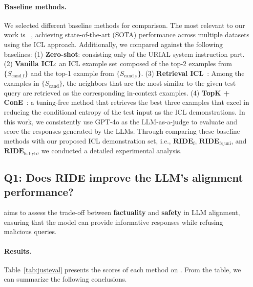 \paragraph{Baseline methods.}
We selected different baseline methods for comparison. 
The most relevant to our work is \textbf{\methodname{}}~\citep{DBLP:conf/iclr/LinRLDSCB024}, achieving state-of-the-art (SOTA) performance across multiple datasets using the ICL approach. 
Additionally, we compared against the following baselines: (1) \textbf{Zero-shot}: consisting only of the URIAL system instruction part. (2) \textbf{Vanilla ICL}: an ICL example set composed of the top-2 examples from $\{S_\text{cand\_f}\}$ and the top-1 example from $\{S_\text{cand\_s}\}$. (3) \textbf{Retrieval ICL}~\citep{liu2022makes}: Among the examples in $\{S_\text{cand}\}$, the neighbors that are the most similar to the given test query are retrieved as the corresponding in-context examples. (4) \textbf{TopK + ConE}~\citep{peng2024revisiting}: a tuning-free method that retrieves the best three examples that excel in reducing the conditional entropy of the test input as the ICL demonstrations.
In this work, we consistently use GPT-4o as the LLM-as-a-judge to evaluate and score the responses generated by the LLMs.
Through comparing these baseline methods with our proposed ICL demonstration set, i.e., $\textbf{RIDE}_{\text{f}}$, $\textbf{RIDE}_{\text{fs\_uni}}$, and $\textbf{RIDE}_{\text{fs\_hyb}}$, we conducted a detailed experimental analysis.

\subsection{Q1: Does \textbf{RIDE} improve the LLM’s alignment performance?}
\label{ssec:exp_justeval}


\dataname{} aims to assess the trade-off between \textbf{\color{myblue} factuality} and \textbf{\color{myred} safety} in LLM alignment, ensuring that the model can provide informative responses while refusing malicious queries.

\paragraph{Results.} Table~\ref{tab:justeval} presents the scores of each method on \dataname{}. 
From the table, we can summarize the following conclusions.

